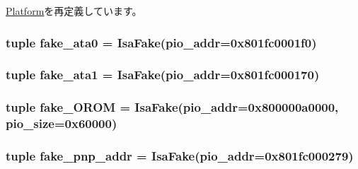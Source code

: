 \hyperlink{classPlatform_1_1Platform_a17da7064bc5c518791f0c891eff05fda}{Platform}を再定義しています。\hypertarget{classTsunami_1_1Tsunami_adbf807504cfb455e68d13f14e31b9a2e}{
\subsubsection[{fake\_\-ata0}]{\setlength{\rightskip}{0pt plus 5cm}tuple {\bf fake\_\-ata0} = {\bf IsaFake}(pio\_\-addr=0x801fc0001f0)}}
\label{classTsunami_1_1Tsunami_adbf807504cfb455e68d13f14e31b9a2e}
\hypertarget{classTsunami_1_1Tsunami_a6bc7a94358dc93e4215db5e80f62f338}{
\subsubsection[{fake\_\-ata1}]{\setlength{\rightskip}{0pt plus 5cm}tuple {\bf fake\_\-ata1} = {\bf IsaFake}(pio\_\-addr=0x801fc000170)}}
\label{classTsunami_1_1Tsunami_a6bc7a94358dc93e4215db5e80f62f338}
\hypertarget{classTsunami_1_1Tsunami_a08b63ccd915fcf9f1bde7f8b8b9a0d5a}{
\subsubsection[{fake\_\-OROM}]{\setlength{\rightskip}{0pt plus 5cm}tuple {\bf fake\_\-OROM} = {\bf IsaFake}(pio\_\-addr=0x800000a0000, pio\_\-size=0x60000)}}
\label{classTsunami_1_1Tsunami_a08b63ccd915fcf9f1bde7f8b8b9a0d5a}
\hypertarget{classTsunami_1_1Tsunami_a136c06a7053d01d772fe86a87025d2af}{
\subsubsection[{fake\_\-pnp\_\-addr}]{\setlength{\rightskip}{0pt plus 5cm}tuple {\bf fake\_\-pnp\_\-addr} = {\bf IsaFake}(pio\_\-addr=0x801fc000279)}}
